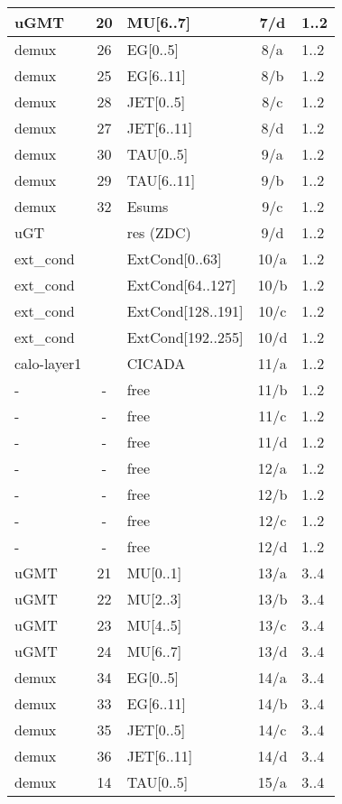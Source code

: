 \begin{longtable}{|l|c|l|c|l|}
uGMT  & 20  & MU[6..7]   & 7/d  & 1..2 \\\hline
demux & 26  & EG[0..5]   & 8/a  & 1..2 \\\hline
demux & 25  & EG[6..11]  & 8/b  & 1..2 \\\hline
demux & 28  & JET[0..5]  & 8/c  & 1..2 \\\hline
demux & 27  & JET[6..11] & 8/d  & 1..2 \\\hline
demux & 30  & TAU[0..5]  & 9/a  & 1..2 \\\hline
demux & 29  & TAU[6..11] & 9/b  & 1..2 \\\hline
demux & 32  & Esums      & 9/c  & 1..2 \\\hline
uGT   &     & res (ZDC)  & 9/d  & 1..2 \\\hline
ext\_cond &     & ExtCond[0..63]    & 10/a & 1..2 \\\hline
ext\_cond &     & ExtCond[64..127]  & 10/b & 1..2 \\\hline
ext\_cond &     & ExtCond[128..191] & 10/c & 1..2 \\\hline
ext\_cond &     & ExtCond[192..255] & 10/d & 1..2 \\\hline
calo-layer1 &   & CICADA & 11/a & 1..2 \\\hline
- & - & free & 11/b & 1..2 \\\hline
- & - & free & 11/c & 1..2 \\\hline
- & - & free & 11/d & 1..2 \\\hline
- & - & free & 12/a & 1..2 \\\hline
- & - & free & 12/b & 1..2 \\\hline
- & - & free & 12/c & 1..2 \\\hline
- & - & free & 12/d & 1..2 \\\hline
\hline
uGMT  & 21  & MU[0..1]   & 13/a & 3..4 \\\hline
uGMT  & 22  & MU[2..3]   & 13/b & 3..4 \\\hline
uGMT  & 23  & MU[4..5]   & 13/c & 3..4 \\\hline
uGMT  & 24  & MU[6..7]   & 13/d & 3..4 \\\hline
demux & 34  & EG[0..5]   & 14/a & 3..4 \\\hline
demux & 33  & EG[6..11]  & 14/b & 3..4 \\\hline
demux & 35  & JET[0..5]  & 14/c & 3..4 \\\hline
demux & 36  & JET[6..11] & 14/d & 3..4 \\\hline
demux & 14  & TAU[0..5]  & 15/a & 3..4 \\\hline

\end{longtable}
